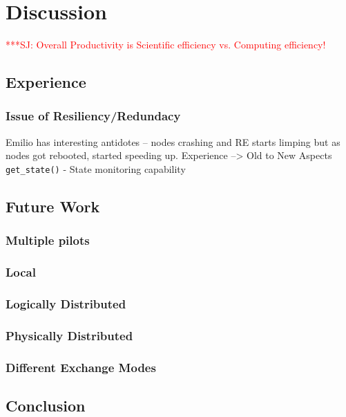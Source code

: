 \documentclass{sig-alternate}
\newcommand{\jhanote}[1]{ {\textcolor{red} { ***SJ: #1 }}}
\newcommand{\jhanote}[1]{}
\begin{document}


\section{Discussion}

\jhanote{Overall Productivity is Scientific efficiency vs. Computing  efficiency!}

\subsection{Experience}

\subsubsection{Issue of Resiliency/Redundacy} Emilio has interesting
antidotes -- nodes crashing and RE starts limping but as nodes got
rebooted, started speeding up.  Experience --> Old to New Aspects
\texttt{get\_state()} - State monitoring capability

\subsection{Future Work}

\subsubsection{Multiple pilots}

\subsubsection{Local}
\subsubsection{Logically Distributed}
\subsubsection{Physically Distributed}

\subsubsection{Different Exchange Modes}

\subsection{Conclusion}
\end{document}
